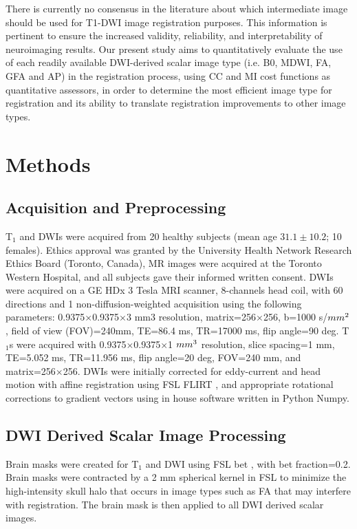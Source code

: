 There is currently no consensus in the literature about which intermediate image should be used for T1-DWI image registration purposes. This information is pertinent to ensure the increased validity, reliability, and interpretability of neuroimaging results. Our present study aims to quantitatively evaluate the use of each readily available DWI-derived scalar image type (i.e. B0, MDWI, FA, GFA and AP) in the registration process, using CC and MI cost functions as quantitative assessors, in order to determine the most efficient image type for registration and its ability to translate registration improvements to other image types.

\section{Methods}

\subsection{Acquisition and Preprocessing}
T$_1$ and DWIs were acquired from 20 healthy subjects (mean age $31.1\pm10.2$; 10 females). Ethics approval was granted by the University Health Network Research Ethics Board (Toronto, Canada), MR images were acquired at the Toronto Western Hospital, and all subjects gave their informed written consent. DWIs were acquired on a GE HDx 3 Tesla MRI scanner, 8-channels head coil, with 60 directions and 1 non-diffusion-weighted acquisition using the following parameters: 0.9375$\times$0.9375$\times$3 mm3 resolution, matrix=256$\times$256, b=1000 s/$mm\textsuperscript{2}$, field of view (FOV)=240mm, TE=86.4 ms, TR=17000 ms, flip angle=90 deg. T$_1$s were acquired with 0.9375$\times$0.9375$\times$1 $mm\textsuperscript{3}$ resolution, slice spacing=1 mm, TE=5.052 ms, TR=11.956 ms, flip angle=20 deg, FOV=240 mm, and matrix=256$\times$256. DWIs were initially corrected for eddy-current and  head motion with affine registration using FSL FLIRT \cite{Jenkinson2001}, and appropriate rotational corrections to gradient vectors \cite{Leemans2009} using in house software written in Python Numpy. 

\subsection{DWI Derived Scalar Image Processing}
Brain masks were created for T$_1$ and DWI using FSL bet \cite{Smith2002}, with bet fraction=0.2. Brain masks were contracted by a 2 mm spherical kernel in FSL to minimize the high-intensity skull halo that occurs in image types such as FA that may interfere with registration. The brain mask is then applied to all DWI derived scalar images.

